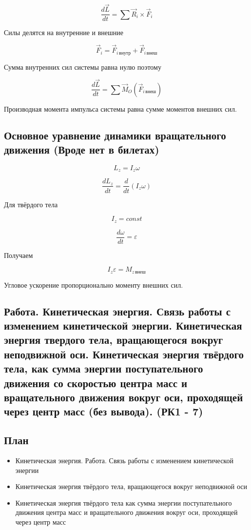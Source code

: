 \documentclass[a4paper,12pt]{article}
\begin{document}
\[
\frac{d\vec L}{dt}
=
\sum \vec R_i \times \vec F_i
\]

Силы делятся на внутренние и внешние

\[
\vec F_i
=
\vec F_{i\,\text{внутр}}
+
\vec F_{i\,\text{внеш}}
\]

Сумма внутренних сил системы равна нулю поэтому 

\[
\frac{d\vec L}{dt}
=
\sum \vec M_O(\vec F_{i\,\text{внеш}})
\]

\begin{theorembox}
Производная момента импульса системы равна сумме моментов внешних сил.
\end{theorembox} 

\vspace{0.8em}

\subsection*{Основное уравнение динамики вращательного движения  (Вроде нет в билетах)}

\[
L_z = I_z \omega
\]

\[
\frac{dL_z}{dt}
=
\frac{d}{dt}(I_z \omega)
\]

Для твёрдого тела

\[
I_z = const
\]

\[
\frac{d\omega}{dt} = \varepsilon
\]

Получаем

\[
I_z \varepsilon = M_{z\,\text{внеш}}
\]

\begin{theorembox}
Угловое ускорение пропорционально моменту внешних сил.
\end{theorembox}

\subsection{Работа. Кинетическая энергия. Связь работы с изменением кинетической энергии.
Кинетическая энергия твердого тела, вращающегося вокруг неподвижной оси.
Кинетическая энергия твёрдого тела, как сумма энергии поступательного движения со
скоростью центра масс и вращательного движения вокруг оси, проходящей через центр
масс (без вывода). (РК1 - 7)}

\subsection*{План}
\begin{itemize}
\item Кинетическая энергия. Работа. Связь работы с изменением кинетической энергии
\item Кинетическая энергия твёрдого тела, вращающегося вокруг неподвижной оси
\item Кинетическая энергия твёрдого тела как сумма энергии поступательного движения центра масс и вращательного движения вокруг оси, проходящей через центр масс
\end{itemize}
\end{document}
